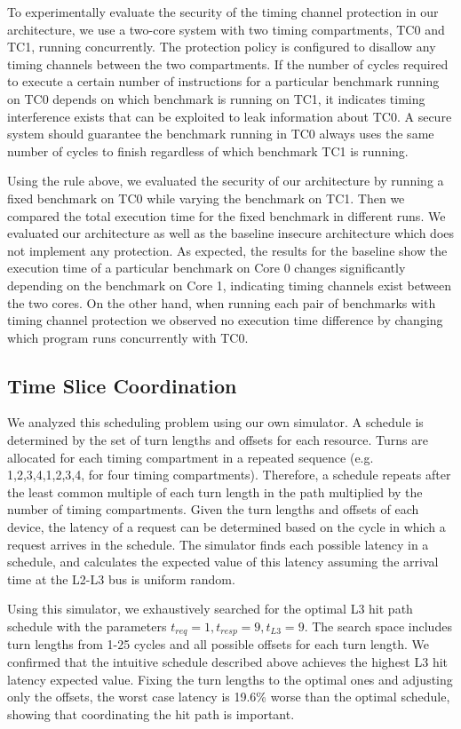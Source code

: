 To experimentally evaluate the security of the timing channel protection in our 
architecture, we use a two-core system with two timing compartments, TC0 and
TC1, running concurrently. The protection policy is configured to disallow any 
timing channels between the two compartments. If the number of cycles required 
to execute a certain number of instructions for a particular benchmark running on 
TC0 depends on which benchmark is running on TC1, it indicates timing 
interference exists that can be exploited to leak information about TC0. A 
secure system should guarantee the benchmark running in TC0 always uses the 
same number of cycles to finish regardless of which benchmark TC1 is running. 

Using the rule above, we evaluated the security of our architecture by running 
a fixed benchmark on TC0 while varying the benchmark on TC1. Then we compared 
the total execution time for the fixed benchmark in different runs. We 
evaluated our architecture as well as the baseline insecure architecture which 
does not implement any protection. As expected, the results for the baseline 
show the execution time of a particular benchmark on Core 0 changes significantly 
depending on the benchmark on Core 1, indicating timing channels exist between
the two cores. On the other hand, when running each pair of benchmarks with 
timing channel protection we observed no execution time difference by changing 
which program runs concurrently with TC0.

\subsection{Time Slice Coordination}
We analyzed this scheduling problem using our own simulator.
A schedule is determined by the set of turn lengths and offsets for each 
resource. Turns are allocated for each timing compartment in a repeated 
sequence (e.g. 1,2,3,4,1,2,3,4, for four timing compartments). Therefore, a 
schedule repeats after the least common multiple of each 
turn length in the path multiplied by the number of timing compartments. Given 
the turn lengths and offsets of each device, the latency of a request can be 
determined based on the cycle in which a request arrives in the schedule.
The simulator finds each possible latency in a schedule, and calculates the 
expected value of this latency assuming the arrival time at the L2-L3 bus is 
uniform random.

Using this simulator, we exhaustively searched for the optimal L3 hit path 
schedule with the parameters $t_{req}=1,t_{resp}=9,t_{L3}=9$. The 
search space includes turn lengths from 1-25 cycles and all possible offsets 
for each turn length. We confirmed that the intuitive schedule described above 
achieves the highest L3 hit latency expected value. Fixing the turn lengths to 
the optimal ones and adjusting only the offsets, the worst case latency is 
19.6\% worse than the optimal schedule, showing that coordinating the hit path 
is important.

